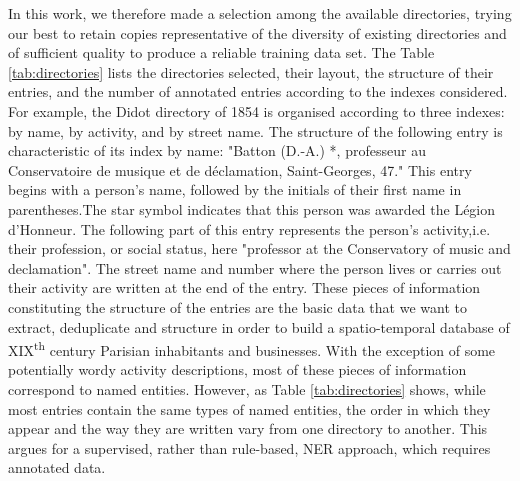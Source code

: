 In this work, we therefore made a selection among the available directories, trying our best to retain copies representative of the diversity of existing directories and of sufficient quality to produce a reliable training data set. The Table \ref{tab:directories} lists the directories selected, their layout, the structure of their entries, and the number of annotated entries according to the indexes considered. For example, the Didot directory of 1854 is organised according to three indexes: by name, by activity, and by street name. The structure of the following entry is characteristic of its index by name: "Batton (D.-A.) *, professeur au Conservatoire de musique et de déclamation, Saint-Georges, 47." This entry begins with a person's name, followed by the initials of their first name in parentheses.The star symbol indicates that this person was awarded the Légion d'Honneur. The following part of this entry represents the person's activity,i.e. their profession, or social status, here "professor at the Conservatory of music and declamation". The street name and number where the person lives or carries out their activity are written at the end of the entry. These pieces of information constituting the structure of the entries are the basic data that we want to extract, deduplicate and structure in order to build a spatio-temporal database of XIX\textsuperscript{th} century Parisian inhabitants and businesses. With the exception of some potentially wordy activity descriptions, most of these pieces of information correspond to named entities. However, as Table \ref{tab:directories} shows, while most entries contain the same types of named entities, the order in which they appear and the way they are written vary from one directory to another. This argues for a supervised, rather than rule-based, NER approach, which requires annotated data.

